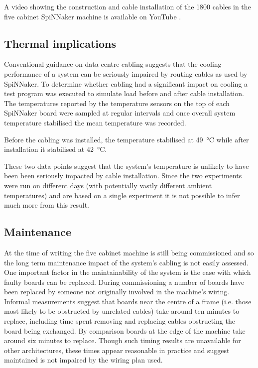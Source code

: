 			A video showing the construction and cable installation of the \num{1800}
			cables in the five cabinet SpiNNaker machine is available on YouTube
			\cite{heathcote16}.
			
		\subsection{Thermal implications}
			
			Conventional guidance on data centre cabling suggests that the cooling
			performance of a system can be seriously impaired by routing cables as
			used by SpiNNaker. To determine whether cabling had a significant impact
			on cooling a test program was executed to simulate load before and after
			cable installation.  The temperatures reported by the temperature sensors
			on the top of each SpiNNaker board were sampled at regular intervals and
			once overall system temperature stabilised the mean temperature was
			recorded.
			
			Before the cabling was installed, the temperature stabilised at
			\SI{49}{\celsius} while after installation it stabilised at
			\SI{42}{\celsius}.
			
			These two data points suggest that the system's temperature is unlikely
			to have been been seriously impacted by cable installation. Since the two
			experiments were run on different days (with potentially vastly different
			ambient temperatures) and are based on a single experiment it is not
			possible to infer much more from this result.
			
		\subsection{Maintenance}
			
			At the time of writing the five cabinet machine is still being
			commissioned and so the long term maintenance impact of the system's
			cabling is not easily assessed. One important factor in the
			maintainability of the system is the ease with which faulty boards can be
			replaced. During commissioning a number of boards have been replaced by
			someone not originally involved in the machine's wiring. Informal
			measurements suggest that boards near the centre of a frame (i.e. those
			most likely to be obstructed by unrelated cables) take around ten minutes
			to replace, including time spent removing and replacing cables
			obstructing the board being exchanged. By comparison boards at the edge
			of the machine take around six minutes to replace. Though such timing
			results are unavailable for other architectures, these times appear
			reasonable in practice and suggest maintained is not impaired by the
			wiring plan used.
	
